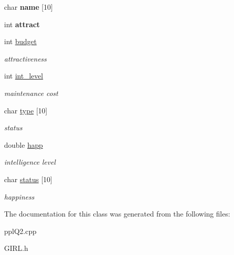 \begin{DoxyCompactItemize}
\item 
\mbox{\label{classGIRL_a3a2d0315c5af8dff6c40c85a178d8dc3}} 
char {\bfseries name} \mbox{[}10\mbox{]}
\item 
\mbox{\label{classGIRL_ad318803047f459499d8ca04e273ffeeb}} 
int {\bfseries attract}
\item 
\mbox{\label{classGIRL_a5a923dc63a6d09356099489d4c7dfbde}} 
int \hyperlink{classGIRL_a5a923dc63a6d09356099489d4c7dfbde}{budget}
\begin{DoxyCompactList}\small\item\em attractiveness \end{DoxyCompactList}\item 
\mbox{\label{classGIRL_aa6da8c4ab9f34e119e8d572edeb404a5}} 
int \hyperlink{classGIRL_aa6da8c4ab9f34e119e8d572edeb404a5}{int\+\_\+level}
\begin{DoxyCompactList}\small\item\em maintenance cost \end{DoxyCompactList}\item 
\mbox{\label{classGIRL_a7c4d97852a7d44914fec313f6466d4b2}} 
char \hyperlink{classGIRL_a7c4d97852a7d44914fec313f6466d4b2}{type} \mbox{[}10\mbox{]}
\begin{DoxyCompactList}\small\item\em status \end{DoxyCompactList}\item 
\mbox{\label{classGIRL_aef64b91193f89b0500a984c0433bfdd8}} 
double \hyperlink{classGIRL_aef64b91193f89b0500a984c0433bfdd8}{happ}
\begin{DoxyCompactList}\small\item\em intelligence level \end{DoxyCompactList}\item 
\mbox{\label{classGIRL_a27478c12737eefcdaadc760b33876772}} 
char \hyperlink{classGIRL_a27478c12737eefcdaadc760b33876772}{status} \mbox{[}10\mbox{]}
\begin{DoxyCompactList}\small\item\em happiness \end{DoxyCompactList}\end{DoxyCompactItemize}


The documentation for this class was generated from the following files\+:\begin{DoxyCompactItemize}
\item 
ppl\+Q2.\+cpp\item 
G\+I\+R\+L.\+h\end{DoxyCompactItemize}

